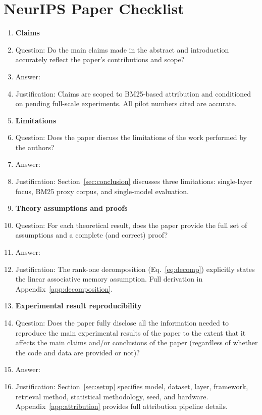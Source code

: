\section*{NeurIPS Paper Checklist}

\begin{enumerate}

\item {\bf Claims}
    \item[] Question: Do the main claims made in the abstract and introduction accurately reflect the paper's contributions and scope?
    \item[] Answer: \answerYes{}
    \item[] Justification: Claims are scoped to BM25-based attribution and conditioned on pending full-scale experiments. All pilot numbers cited are accurate.

\item {\bf Limitations}
    \item[] Question: Does the paper discuss the limitations of the work performed by the authors?
    \item[] Answer: \answerYes{}
    \item[] Justification: Section~\ref{sec:conclusion} discusses three limitations: single-layer focus, BM25 proxy corpus, and single-model evaluation.

\item {\bf Theory assumptions and proofs}
    \item[] Question: For each theoretical result, does the paper provide the full set of assumptions and a complete (and correct) proof?
    \item[] Answer: \answerYes{}
    \item[] Justification: The rank-one decomposition (Eq.~\ref{eq:decomp}) explicitly states the linear associative memory assumption. Full derivation in Appendix~\ref{app:decomposition}.

    \item {\bf Experimental result reproducibility}
    \item[] Question: Does the paper fully disclose all the information needed to reproduce the main experimental results of the paper to the extent that it affects the main claims and/or conclusions of the paper (regardless of whether the code and data are provided or not)?
    \item[] Answer: \answerYes{}
    \item[] Justification: Section~\ref{sec:setup} specifies model, dataset, layer, framework, retrieval method, statistical methodology, seed, and hardware. Appendix~\ref{app:attribution} provides full attribution pipeline details.


\end{enumerate}
